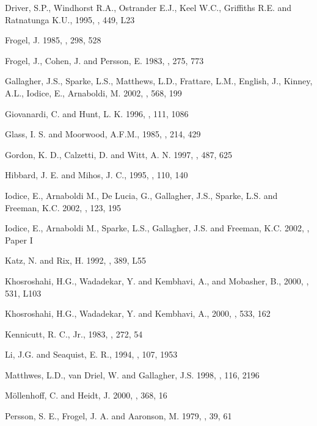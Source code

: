 \documentclass{aa}
\begin{document}
\begin{thebibliography}{}
 Driver, S.P., Windhorst R.A., Ostrander E.J.,
Keel W.C., Griffiths R.E. and Ratnatunga K.U., 1995, \apjl, 449, L23  

 Frogel, J. 1985, \apj, 298, 528 

 Frogel, J., Cohen, J. and Persson, E. 1983, \aj, 275, 773

 Gallagher, J.S., Sparke, L.S., Matthews, L.D.,
Frattare, L.M., English, J., Kinney, A.L., Iodice, E., Arnaboldi, M. 2002, 
\apj, 568, 199                      

 Giovanardi, C. and Hunt, L. K. 1996, \aj, 111, 1086
                       
 Glass, I. S. and Moorwood, A.F.M., 1985, \mnras, 214, 429
                                 
 Gordon, K. D., Calzetti, D. and Witt, A. N. 1997, \apj, 
487, 625                                       

 Hibbard, J. E. and Mihos, J. C., 1995, \aj, 110, 140 

 Iodice, E., Arnaboldi M., De Lucia, G., Gallagher, J.S.,
Sparke, L.S. and Freeman, K.C. 2002, \aj, 123, 195

 Iodice, E., Arnaboldi M., 
Sparke, L.S., Gallagher, J.S. and Freeman, K.C. 2002, \aap, Paper I  
                   
 Katz, N. and Rix, H. 1992, \apjl, 389, L55

  Khosroshahi, H.G., Wadadekar, Y. and Kembhavi, A.,
and Mobasher, B., 2000, \apj, 531, L103  

  Khosroshahi, H.G., Wadadekar, Y. and Kembhavi, A.,
2000, \apj, 533, 162  

  Kennicutt, R. C., Jr., 1983, \apj, 272, 54  

 Li, J.G. and Seaquist, E. R., 1994, \aj, 107, 1953

 Matthwes, L.D., van Driel, W. and Gallagher, J.S. 1998, 
\aj, 116, 2196  

 M\"{o}llenhoff, C. and Heidt, J. 2000, 
\aap, 368, 16  

 Persson, S. E., Frogel, J. A. and Aaronson, M. 1979, 
\apjs, 39, 61  


\end{thebibliography}
\end{document}
